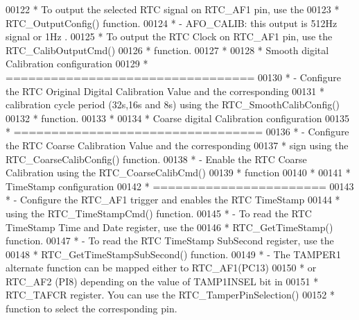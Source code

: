 \begin{DoxyCode}
00122 \textcolor{comment}{  *              To output the selected RTC signal on RTC\_AF1 pin, use the }
00123 \textcolor{comment}{  *              RTC\_OutputConfig() function.                }
00124 \textcolor{comment}{  *            - AFO\_CALIB: this output is 512Hz signal or 1Hz .  }
00125 \textcolor{comment}{  *              To output the RTC Clock on RTC\_AF1 pin, use the RTC\_CalibOutputCmd()}
00126 \textcolor{comment}{  *              function.}
00127 \textcolor{comment}{  *}
00128 \textcolor{comment}{  *          Smooth digital Calibration configuration}
00129 \textcolor{comment}{  *          =================================    }
00130 \textcolor{comment}{  *            - Configure the RTC Original Digital Calibration Value and the corresponding}
00131 \textcolor{comment}{  *              calibration cycle period (32s,16s and 8s) using the RTC\_SmoothCalibConfig() }
00132 \textcolor{comment}{  *              function.}
00133 \textcolor{comment}{  *}
00134 \textcolor{comment}{  *          Coarse digital Calibration configuration}
00135 \textcolor{comment}{  *          =================================}
00136 \textcolor{comment}{  *            - Configure the RTC Coarse Calibration Value and the corresponding}
00137 \textcolor{comment}{  *              sign using the RTC\_CoarseCalibConfig() function.}
00138 \textcolor{comment}{  *            - Enable the RTC Coarse Calibration using the RTC\_CoarseCalibCmd() }
00139 \textcolor{comment}{  *              function  }
00140 \textcolor{comment}{  *}
00141 \textcolor{comment}{  *          TimeStamp configuration}
00142 \textcolor{comment}{  *          =======================}
00143 \textcolor{comment}{  *            - Configure the RTC\_AF1 trigger and enables the RTC TimeStamp }
00144 \textcolor{comment}{  *              using the RTC\_TimeStampCmd() function.}
00145 \textcolor{comment}{  *            - To read the RTC TimeStamp Time and Date register, use the }
00146 \textcolor{comment}{  *              RTC\_GetTimeStamp() function.}
00147 \textcolor{comment}{  *            - To read the RTC TimeStamp SubSecond register, use the }
00148 \textcolor{comment}{  *              RTC\_GetTimeStampSubSecond() function.}
00149 \textcolor{comment}{  *            - The TAMPER1 alternate function can be mapped either to RTC\_AF1(PC13)}
00150 \textcolor{comment}{  *              or RTC\_AF2 (PI8) depending on the value of TAMP1INSEL bit in }
00151 \textcolor{comment}{  *              RTC\_TAFCR register. You can use the  RTC\_TamperPinSelection()}
00152 \textcolor{comment}{  *              function to select the corresponding pin.     }

\end{DoxyCode}
